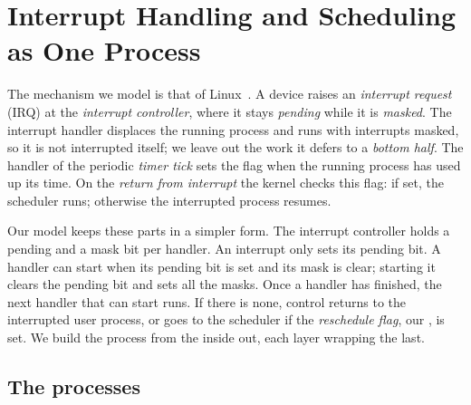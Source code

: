 \section{Interrupt Handling and Scheduling as One Process}\label{sec:model}
The mechanism we model is that of
Linux~\cite{love2010}. A device raises an \emph{interrupt request} (IRQ) at the
\emph{interrupt controller}, where it stays \emph{pending} while it is \emph{masked}.
The interrupt handler displaces the running process and runs with interrupts
masked, so it is not interrupted itself; we leave
out the work it defers to a \emph{bottom half}. The handler of the periodic
\emph{timer tick} sets the  flag when the running process has used
up its time. On the \emph{return from interrupt} the kernel checks this flag: if set,
the scheduler runs; otherwise the interrupted process resumes.

Our model keeps these parts in a simpler form. The interrupt controller holds a pending and a mask bit per
handler. An interrupt only sets its pending bit. A handler
can start when its pending bit is set and its mask is clear; starting it clears the
pending bit and sets all the masks. Once a handler has finished, the next handler that
can start runs. If there is none, control returns to the interrupted user process, or
goes to the scheduler if the \emph{reschedule flag}, our , is set.
We build the process from the inside out, each layer wrapping the last.

\subsection{The processes}\label{sec:processes}

